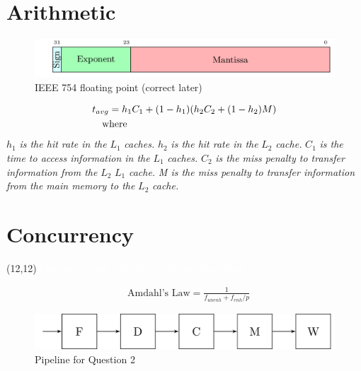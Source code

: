 \section{Arithmetic}
\begin{figure}
	\centering
	\includegraphics[width=1\linewidth]{CENG355/Exponent.png}
	\caption{IEEE 754 floating point (correct later)}
	\label{fig:exponent}
\end{figure}
\begin{align}
& t_{avg} = h_1C_1 + (1-h_1)(h_2C_2 + (1-h_2)M) \\
& \quad \text{where}  \notag
\end{align}
$h_1$ \textit{is the hit rate in the } $L_1$ \textit{caches.} \newline 
$h_2$ \textit{is the hit rate in the } $L_2$ \textit{ cache.} \newline
$C_1$ \textit{is the time to access information in the } $L_1$ \textit{caches.}\newline
$C_2$ \textit{is the miss penalty to transfer information from the } $L_2$  $L_1$ \textit{ cache.} \newline
\textit{M is the miss penalty to transfer information from the main memory to the } $L_2$ \textit{cache.}

\section{Concurrency}

\colorbox{capri!85}{\makebox(12,12){\textcolor{white}{This better work rofl, why is this so damn hard}}}
\setlength{\fboxrule}{6pt}%

\begin{align*}
& \text{Amdahl's Law} =  \frac{1}{f_{unenh} + f_{enh}/p}
\end{align*}

\begin{figure}
	\centering
	\includegraphics[width=1\linewidth]{CENG355/Pipeline.png}
	\caption{Pipeline for Question 2}
	\label{fig:q2diagram}
\end{figure}
